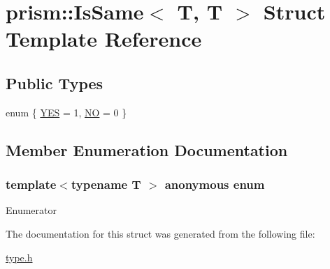 \hypertarget{structprism_1_1_is_same_3_01_t_00_01_t_01_4}{}\section{prism\+:\+:Is\+Same$<$ T, T $>$ Struct Template Reference}
\label{structprism_1_1_is_same_3_01_t_00_01_t_01_4}
\subsection*{Public Types}
\begin{DoxyCompactItemize}
\item 
enum \{ \hyperlink{structprism_1_1_is_same_3_01_t_00_01_t_01_4_a48ff570e7ca59fc2640cbc2455c61033a0b871dbf90b49f78471795810ea6b953}{Y\+ES} = 1, 
\hyperlink{structprism_1_1_is_same_3_01_t_00_01_t_01_4_a48ff570e7ca59fc2640cbc2455c61033a2e7829a5361ee57688d15af4d2f7b269}{NO} = 0
 \}
\end{DoxyCompactItemize}


\subsection{Member Enumeration Documentation}
\subsubsection[{\texorpdfstring{anonymous enum}{anonymous enum}}]{\setlength{\rightskip}{0pt plus 5cm}template$<$typename T $>$ anonymous enum}\hypertarget{structprism_1_1_is_same_3_01_t_00_01_t_01_4_a48ff570e7ca59fc2640cbc2455c61033}{}\label{structprism_1_1_is_same_3_01_t_00_01_t_01_4_a48ff570e7ca59fc2640cbc2455c61033}
\begin{Desc}
\item[Enumerator]\par
\begin{description}
\item[{\em 
Y\+ES\hypertarget{structprism_1_1_is_same_3_01_t_00_01_t_01_4_a48ff570e7ca59fc2640cbc2455c61033a0b871dbf90b49f78471795810ea6b953}{}\label{structprism_1_1_is_same_3_01_t_00_01_t_01_4_a48ff570e7ca59fc2640cbc2455c61033a0b871dbf90b49f78471795810ea6b953}
}]\item[{\em 
NO\hypertarget{structprism_1_1_is_same_3_01_t_00_01_t_01_4_a48ff570e7ca59fc2640cbc2455c61033a2e7829a5361ee57688d15af4d2f7b269}{}\label{structprism_1_1_is_same_3_01_t_00_01_t_01_4_a48ff570e7ca59fc2640cbc2455c61033a2e7829a5361ee57688d15af4d2f7b269}
}]\end{description}
\end{Desc}


The documentation for this struct was generated from the following file\+:\begin{DoxyCompactItemize}
\item 
\hyperlink{type_8h}{type.\+h}\end{DoxyCompactItemize}
